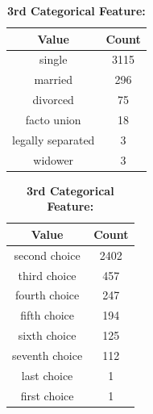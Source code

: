 \documentclass{article}
\begin{document}
\begin{table}[h!]
    \centering %
    \begin{subtable}[t]{0.4\textwidth}
        \centering %
        \begin{tabular}{|c|c|}
            \hline
            Value & Count \\
            \hline
            single    & 3115 \\
            married  & 296 \\
            divorced & 75 \\
            facto union & 18 \\
            legally separated & 3 \\
            widower & 3\\
            \hline
        \end{tabular}
        \caption{\textbf{1st Categorical Feature:}} %
    \end{subtable}
    \begin{subtable}[t]{0.4\textwidth}
        \centering %
        \begin{tabular}{|c|c|}
            \hline
            Value & Count \\
            \hline
            second choice   & 2402 \\
            third choice & 457 \\
            fourth choice  & 247 \\
            fifth choice & 194 \\
            sixth choice & 125 \\
            seventh choice & 112 \\
            last choice  & 1 \\
            first choice  & 1 \\
            \hline
        \end{tabular}
        \caption{\textbf{3rd Categorical Feature:}} %
    \end{subtable}

\end{table}
\end{document}
